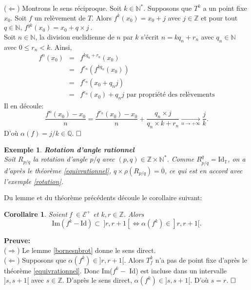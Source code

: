 \documentclass[11pt,a4 paper]{article}
\newtheorem{ex}[theoreme]{Exemple}
\newtheorem{corollaire}[theoreme]{Corollaire}
\newcommand{\Tbb}{\mathbb{T}}
\newenvironment{coro}{\begin{box_coro}\begin{corollaire}}{\end{corollaire}\end{box_coro}}
\begin{document}
	($\Leftarrow$) Montrons le sens réciproque. Soit $k \in \mathbb{N}^*$. Supposons que $T^k$ a un point fixe $x_0$. Soit $f$ un relèvement de $T$. Alors $f^k(x_0)= x_0 + j$ avec $j \in \mathbb{Z}$ et pour tout $q \in \mathbb{N}$, $f^{qk}(x_0)=x_0 + q\times j\ $.\\
	Soit $n \in \mathbb{N}$, la division euclidienne de $n$ par $k$ s'écrit $n = k  q_n + r_n$ avec $q_n \in \mathbb{N}$ avec $0 \leq r_n < k$.
	Ainsi,
	\begin{eqnarray*}
		f^n(x_0)&=&f^{k  q_n +r_n}(x_0)\\
		&=& f^{r_n}(f^{k  q_n}(x_0))\\
		&=&f^{r_n}(x_0 + q_n j) \\
		&=& f^{r_n}(x_0) + q_n  j \text{ par propriété des relèvements}
	\end{eqnarray*}
	Il en découle:
	$$\frac{f^n(x_0) - x_0}{n}=\frac{f^{r_n}(x_0)-x_0}{n} + \frac{q_n \times j}{q_n \times k + r_n} \underset{n \to +  \infty}{\longrightarrow} \frac{j}{k}.$$
	D'où $\alpha(f)=j/k \in \mathbb{Q}$. $\hfill \square$\\
		

\begin{ex}
	\textbf{Rotation d'angle rationnel}\\
	Soit $R_{p/q}$ la rotation d'angle $p/q$ avec $(p,q) \in \mathbb{Z} \times \mathbb{N}^*$. Comme $R_{p/q}^q= \mathrm{Id_{\Tbb}}$, on a d'après le théorème \ref{equivrationnel}, $q \times \rho(R_{p/q})= \overline{0}$, ce qui est en accord avec l'exemple \ref{rotation}.
\end{ex}

\par Du lemme et du théorème précédents découle le corollaire suivant:








\begin{coro}\label{equiv amel}
	Soient f $\in \mathcal{E}^+$ et $k,r \in \mathbb{Z}$. Alors
	$$\mathrm{Im}(f^k - \mathrm{Id})\subset \ ]r,r+1[ \Longleftrightarrow  \alpha(f^k) \in ]r,r+1[.$$
\end{coro}

\textbf{Preuve:}\\
($\Rightarrow$) Le lemme \ref{bornesnbrot} donne le sens direct. \\
($\Leftarrow$) Supposons que $\alpha(f^k) \in ]r,r+1[$. Alors $T_f^k$ n'a pas de point fixe d'après le théorème \ref{equivrationnel}. Donc Im($f^k -$ Id) est incluse dans un intervalle $]s,s+1[$ avec $s \in \mathbb{Z}$. D'après le sens direct, $\alpha(f^k) \in ]s,s+1[$. D'où $s=r$. $\hfill \square$\\
\end{document}
